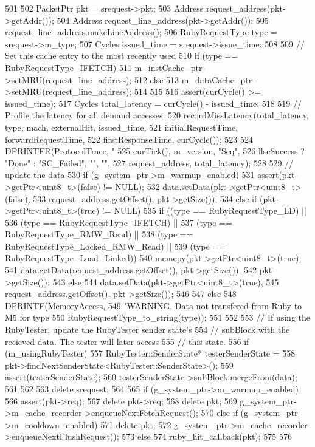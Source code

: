 \begin{DoxyCode}
501 {
502     PacketPtr pkt = srequest->pkt;
503     Address request_address(pkt->getAddr());
504     Address request_line_address(pkt->getAddr());
505     request_line_address.makeLineAddress();
506     RubyRequestType type = srequest->m_type;
507     Cycles issued_time = srequest->issue_time;
508 
509     // Set this cache entry to the most recently used
510     if (type == RubyRequestType_IFETCH) {
511         m_instCache_ptr->setMRU(request_line_address);
512     } else {
513         m_dataCache_ptr->setMRU(request_line_address);
514     }
515 
516     assert(curCycle() >= issued_time);
517     Cycles total_latency = curCycle() - issued_time;
518 
519     // Profile the latency for all demand accesses.
520     recordMissLatency(total_latency, type, mach, externalHit, issued_time,
521                       initialRequestTime, forwardRequestTime,
522                       firstResponseTime, curCycle());
523 
524     DPRINTFR(ProtocolTrace, "%
525              curTick(), m_version, "Seq",
526              llscSuccess ? "Done" : "SC_Failed", "", "",
527              request_address, total_latency);
528 
529     // update the data
530     if (g_system_ptr->m_warmup_enabled) {
531         assert(pkt->getPtr<uint8_t>(false) != NULL);
532         data.setData(pkt->getPtr<uint8_t>(false),
533                      request_address.getOffset(), pkt->getSize());
534     } else if (pkt->getPtr<uint8_t>(true) != NULL) {
535         if ((type == RubyRequestType_LD) ||
536             (type == RubyRequestType_IFETCH) ||
537             (type == RubyRequestType_RMW_Read) ||
538             (type == RubyRequestType_Locked_RMW_Read) ||
539             (type == RubyRequestType_Load_Linked)) {
540             memcpy(pkt->getPtr<uint8_t>(true),
541                    data.getData(request_address.getOffset(), pkt->getSize()),
542                    pkt->getSize());
543         } else {
544             data.setData(pkt->getPtr<uint8_t>(true),
545                          request_address.getOffset(), pkt->getSize());
546         }
547     } else {
548         DPRINTF(MemoryAccess,
549                 "WARNING.  Data not transfered from Ruby to M5 for type %
550                 RubyRequestType_to_string(type));
551     }
552 
553     // If using the RubyTester, update the RubyTester sender state's
554     // subBlock with the recieved data.  The tester will later access
555     // this state.
556     if (m_usingRubyTester) {
557         RubyTester::SenderState* testerSenderState =
558             pkt->findNextSenderState<RubyTester::SenderState>();
559         assert(testerSenderState);
560         testerSenderState->subBlock.mergeFrom(data);
561     }
562 
563     delete srequest;
564 
565     if (g_system_ptr->m_warmup_enabled) {
566         assert(pkt->req);
567         delete pkt->req;
568         delete pkt;
569         g_system_ptr->m_cache_recorder->enqueueNextFetchRequest();
570     } else if (g_system_ptr->m_cooldown_enabled) {
571         delete pkt;
572         g_system_ptr->m_cache_recorder->enqueueNextFlushRequest();
573     } else {
574         ruby_hit_callback(pkt);
575     }
576 }
\end{DoxyCode}
